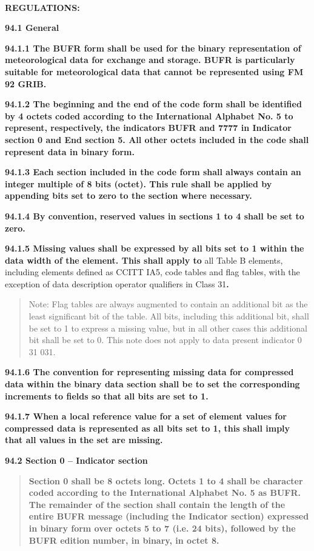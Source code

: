 \textbf{\\
}

\textbf{REGULATIONS:}

\textbf{94.1 General}

\textbf{94.1.1 The BUFR form shall be used for the binary representation of meteorological data for exchange and storage. BUFR is particularly suitable for meteorological data that cannot be represented using FM 92 GRIB.}

\textbf{94.1.2 The beginning and the end of the code form shall be identified by 4 octets coded according to the International Alphabet No. 5 to represent, respectively, the indicators BUFR and 7777 in Indicator section 0 and End section 5. All other octets included in the code shall represent data in binary form.}

\textbf{94.1.3 Each section included in the code form shall always contain an integer multiple of 8 bits (octet). This rule shall be applied by appending bits set to zero to the section where necessary.}

\textbf{94.1.4 By convention, reserved values in sections 1 to 4 shall be set to zero.}

\textbf{94.1.5 Missing values shall be expressed by all bits set to 1 within the data width of the element. This shall apply to} all Table B elements, including elements defined as CCITT IA5, code tables and flag tables, with the exception of data description operator qualifiers in Class 31\textbf{.}

\begin{quote}
Note: Flag tables are always augmented to contain an additional bit as the least significant bit of the table. All bits, including this additional bit, shall be set to 1 to express a missing value, but in all other cases this additional bit shall be set to 0. This note does not apply to data present indicator 0 31 031.
\end{quote}

\textbf{94.1.6 The convention for representing missing data for compressed data within the binary data section shall be to set the corresponding increments to fields so that all bits are set to 1.}

\textbf{94.1.7 When a local reference value for a set of element values for compressed data is represented as all bits set to 1, this shall imply that all values in the set are missing.}

\textbf{94.2 Section 0 -- Indicator section}

\begin{quote}
\textbf{Section 0 shall be 8 octets long. Octets 1 to 4 shall be character coded according to the International Alphabet No. 5 as BUFR. The remainder of the section shall contain the length of the entire BUFR message (including the Indicator section) expressed in binary form over octets 5 to 7 (i.e. 24 bits), followed by the BUFR edition number, in binary, in octet 8.}
\end{quote}


